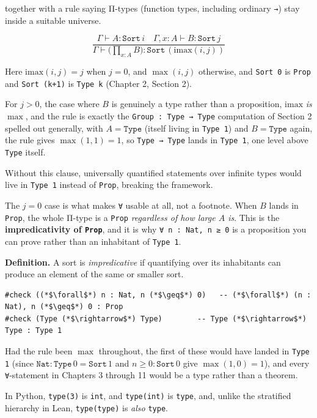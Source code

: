 together with a rule saying Π-types (function types, including ordinary \texttt{→}) stay inside a suitable universe.

\[
\dfrac{\Gamma \vdash A : \mathtt{Sort}\,i \quad \Gamma, x:A \vdash B : \mathtt{Sort}\,j}
      {\Gamma \vdash \big(\textstyle\prod_{x:A} B\big) : \mathtt{Sort}\,(\mathrm{imax}(i,j))}
\]

Here \(\mathrm{imax}(i, j) = j\) when \(j = 0\), and \(\max(i, j)\) otherwise, and \texttt{Sort 0} is \texttt{Prop} and \texttt{Sort (k+1)} is \texttt{Type k} (Chapter 2, Section 2).

For \(j > 0\), the case where \(B\) is genuinely a type rather than a proposition, \(\mathrm{imax}\) \emph{is} \(\max\), and the rule is exactly the \texttt{Group : Type → Type} computation of Section 2 spelled out generally, with \(A = \mathtt{Type}\) (itself living in \texttt{Type 1}) and \(B = \mathtt{Type}\) again, the rule gives \(\max(1, 1) = 1\), so \texttt{Type → Type} lands in \texttt{Type 1}, one level above \texttt{Type} itself.

Without this clause, universally quantified statements over infinite types would live in \texttt{Type 1} instead of \texttt{Prop}, breaking the framework.

The \(j = 0\) case is what makes \texttt{∀} usable at all, not a footnote. When \(B\) lands in \texttt{Prop}, the whole Π-type is a \texttt{Prop} \emph{regardless of how large \(A\) is}. This is the \textbf{impredicativity of \texttt{Prop}}, and it is why \texttt{∀ n : Nat, n ≥ 0} is a proposition you can prove rather than an inhabitant of \texttt{Type 1}.

\textbf{Definition.} A sort is \emph{impredicative} if quantifying over its inhabitants can produce an element of the same or smaller sort.

\begin{lstlisting}
#check ((*$\forall$*) n : Nat, n (*$\geq$*) 0)   -- (*$\forall$*) (n : Nat), n (*$\geq$*) 0 : Prop
#check (Type (*$\rightarrow$*) Type)        -- Type (*$\rightarrow$*) Type : Type 1
\end{lstlisting}

Had the rule been \(\max\) throughout, the first of these would have landed in \texttt{Type 1} (since \(\mathtt{Nat} : \mathtt{Type}\,0 = \mathtt{Sort}\,1\) and \(n \ge 0 : \mathtt{Sort}\,0\) give \(\max(1,0) = 1\)), and every \texttt{∀}-statement in Chapters 3 through 11 would be a type rather than a theorem.

\begin{progcorner}

In Python, \texttt{type(3)} is \texttt{int}, and \texttt{type(int)} is \texttt{type}, and, unlike the stratified hierarchy in Lean, \texttt{type(type)} is \emph{also} \texttt{type}.

\end{progcorner}

